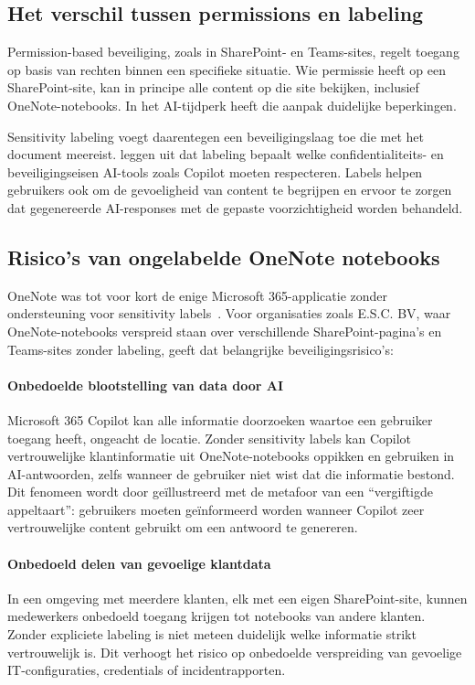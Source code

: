 \subsection{Het verschil tussen permissions en labeling}
\label{subsec:permissions-vs-labeling}

Permission-based beveiliging, zoals in SharePoint- en Teams-sites, regelt toegang op basis van rechten binnen een specifieke situatie.
Wie permissie heeft op een SharePoint-site, kan in principe alle content op die site bekijken, inclusief OneNote-notebooks.
In het AI-tijdperk heeft die aanpak duidelijke beperkingen.

Sensitivity labeling voegt daarentegen een beveiligingslaag toe die met het document meereist.
\textcite{hay2025onenote} leggen uit dat labeling bepaalt welke confidentialiteits- en beveiligingseisen AI-tools zoals Copilot moeten respecteren. 
Labels helpen gebruikers ook om de gevoeligheid van content te begrijpen en ervoor te zorgen dat gegenereerde AI-responses met de gepaste voorzichtigheid worden behandeld.

\subsection{Risico's van ongelabelde OneNote notebooks}
\label{subsec:risicos-ongelabelde-notebooks}

OneNote was tot voor kort de enige Microsoft 365-applicatie zonder ondersteuning voor sensitivity labels~\autocite{hay2025onenote}.
Voor organisaties zoals E.S.C. BV, waar OneNote-notebooks verspreid staan over verschillende SharePoint-pagina's en Teams-sites zonder labeling, geeft dat belangrijke beveiligingsrisico's:

\paragraph{Onbedoelde blootstelling van data door AI}
Microsoft 365 Copilot kan alle informatie doorzoeken waartoe een gebruiker toegang heeft, ongeacht de locatie.
Zonder sensitivity labels kan Copilot vertrouwelijke klantinformatie uit OneNote-notebooks oppikken en gebruiken in AI-antwoorden, zelfs wanneer de gebruiker niet wist dat die informatie bestond.
Dit fenomeen wordt door \textcite{hay2025onenote} geïllustreerd met de metafoor van een ``vergiftigde appeltaart'': gebruikers moeten geïnformeerd worden wanneer Copilot zeer vertrouwelijke content gebruikt om een antwoord te genereren.

\paragraph{Onbedoeld delen van gevoelige klantdata}
In een omgeving met meerdere klanten, elk met een eigen SharePoint-site, kunnen medewerkers onbedoeld toegang krijgen tot notebooks van andere klanten.
Zonder expliciete labeling is niet meteen duidelijk welke informatie strikt vertrouwelijk is.
Dit verhoogt het risico op onbedoelde verspreiding van gevoelige IT-configuraties, credentials of incidentrapporten.

